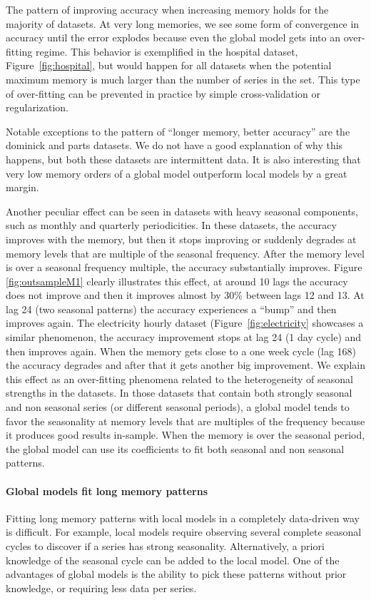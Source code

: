 \documentclass[a4paper]{article}
\theoremstyle{custom}
\begin{document}
The pattern of improving accuracy when increasing memory holds for the majority of datasets. At very long memories, we see some form of convergence in accuracy until the error explodes because even the global model gets into an over-fitting regime. This behavior is exemplified in the hospital dataset, Figure~\ref{fig:hospital}, but would happen for all datasets when the potential maximum memory is much larger than the number of series in the set. This type of over-fitting can be prevented in practice by simple cross-validation or regularization.

Notable exceptions to the pattern of ``longer memory, better accuracy'' are the dominick and parts datasets. We do not have a good explanation of why this happens, but both these datasets are intermittent data. It is also interesting that very low memory orders of a global model outperform local models by a great margin.

Another peculiar effect can be seen in datasets with heavy seasonal components, such as monthly and quarterly periodicities. In these datasets, the accuracy improves with the memory, but then it stops improving or suddenly degrades at memory levels that are multiple of the seasonal frequency. After the memory level is over a seasonal frequency multiple, the accuracy substantially improves. Figure \ref{fig:outsampleM1} clearly illustrates this effect, at around 10 lags the accuracy does not improve and then it improves almost by 30\% between lags 12 and 13. At lag 24 (two seasonal patterns) the accuracy experiences a ``bump'' and then improves again. The electricity hourly dataset (Figure~\ref{fig:electricity} showcases a similar phenomenon, the accuracy improvement stops at lag 24 (1 day cycle) and then improves again. When the memory gets close to a one week cycle (lag 168) the accuracy degrades and after that it gets another big improvement.
We explain this effect as an over-fitting phenomena related to the heterogeneity of seasonal strengths in the datasets. In those datasets that contain both strongly seasonal and non seasonal series (or different seasonal periods), a global model tends to favor the seasonality at memory levels that are multiples of the frequency because it produces good results in-sample. When the memory is over the seasonal period, the global model can use its coefficients to fit both seasonal and non seasonal patterns.

\paragraph{Global models fit long memory patterns}
Fitting long memory patterns with local models in a completely data-driven way is difficult. For example, local models require observing several complete seasonal cycles to discover if a series has strong seasonality. Alternatively, a priori knowledge of the seasonal cycle can be added to the local model. One of the advantages of global models is the ability to pick these patterns without prior knowledge, or requiring less data per series.
\end{document}
